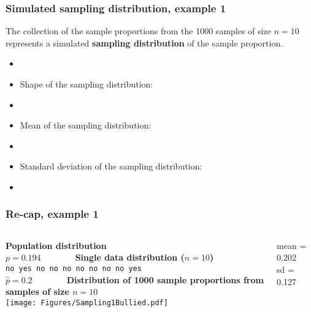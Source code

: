 \begin{frame}
\frametitle{Simulated sampling distribution, example 1}
The collection of the sample proportions from the 1000 samples of size $n=10$ represents a simulated \textbf{sampling distribution} of the sample proportion.
\begin{itemize}
    \item[]
    \item
    Shape of the sampling distribution:
    \item[]
    \item
    Mean of the sampling distribution:
    \item[]
    \item
    Standard deviation of the sampling distribution:
    \item[]
\end{itemize}
\end{frame}

\begin{frame}
\frametitle{Re-cap, example 1}
\begin{columns}
\textbf{Population distribution}\\
\vskip10pt
$p=0.194$
\vskip110pt
\textcolor{white}{nothing}
\textbf{Single data distribution ($n=10$)}\\
\vskip10pt
\texttt{no yes	no	no	no	no	no	no	no	yes}\\
\vskip10pt
$\hat{p}=0.2$	
\vskip80pt
\textcolor{white}{nothing}
\textbf{Distribution of 1000 sample proportions from samples of size $n=10$}\\
\texttt{[image: Figures/Sampling1Bullied.pdf]}
\begin{center}
    mean = 0.202\\
     sd  = 0.127
\end{center}
\end{columns}
\end{frame}

